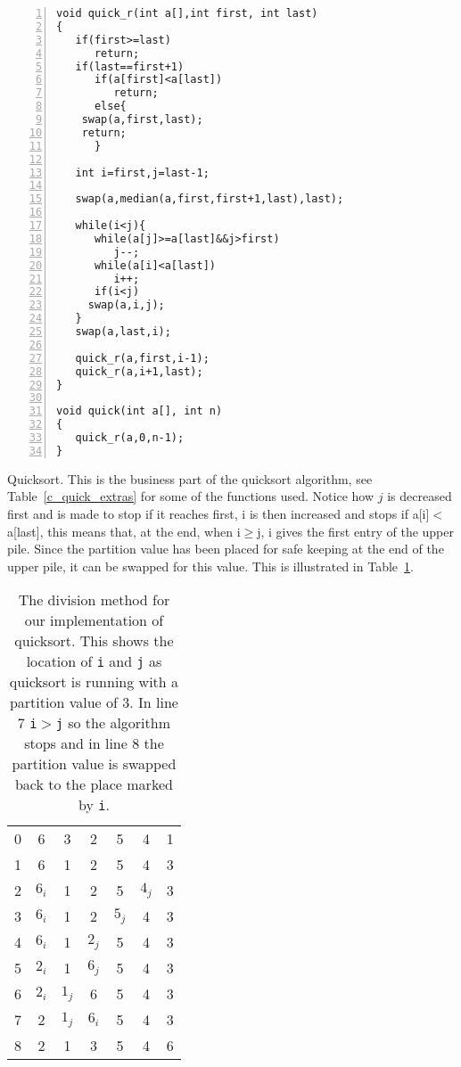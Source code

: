 \documentclass[11pt,a4paper]{scrartcl}
\begin{document}
\begin{table}
\begin{lstlisting}[numbers=left]
void quick_r(int a[],int first, int last)
{
   if(first>=last)
      return;
   if(last==first+1)
      if(a[first]<a[last])
         return;
      else{
	swap(a,first,last);
	return;
      }

   int i=first,j=last-1;

   swap(a,median(a,first,first+1,last),last);
  
   while(i<j){
      while(a[j]>=a[last]&&j>first)
         j--;
      while(a[i]<a[last])
         i++;
      if(i<j)
	 swap(a,i,j);
   }
   swap(a,last,i);

   quick_r(a,first,i-1);
   quick_r(a,i+1,last);
}

void quick(int a[], int n)
{
   quick_r(a,0,n-1);
}
\end{lstlisting}
\caption{Quicksort. This is the business part of the quicksort
  algorithm, see Table~\ref{c_quick_extras} for some of the functions
  used. Notice how $j$ is decreased first and is made to stop if it
  reaches first, i is then increased and stops if a[i]$<$a[last], this
  means that, at the end, when i$\ge$j, i gives the first entry of the
  upper pile. Since the partition value has been placed for safe
  keeping at the end of the upper pile, it can be swapped for this
  value. This is illustrated in
  Table~\ref{table_quick_careful}.\label{c_quick}}
\end{table}



\begin{table}
\begin{tabular}{c|cccccc}
0&6&3&2&5&4&1\\
1&6&1&2&5&4&3\\
2&$6_i$&1&2&5&$4_j$&3\\
3&$6_i$&1&2&$5_j$&4&3\\
4&$6_i$&1&$2_j$&5&4&3\\
5&$2_i$&1&$6_j$&5&4&3\\
6&$2_i$&$1_j$&6&5&4&3\\
7&2&$1_j$&$6_i$&5&4&3\\
8&2&1&3&5&4&6
\end{tabular}
\caption{The division method for our implementation of quicksort. This
  shows the location of \texttt{i} and \texttt{j} as quicksort is running with a partition value of 3. In line 7 \texttt{i}$>$\texttt{j}
  so the algorithm stops and in line 8 the partition value is swapped
  back to the place marked by \texttt{i}.\label{table_quick_careful}}
\end{table}
\end{document}
